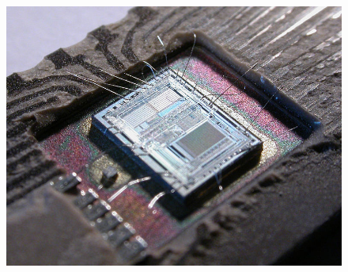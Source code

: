 \begin{frame}
\begin{minipage}{0.5\textwidth}
\vspace{0.5cm}
\begin{center}
\begin{figure}
        \includegraphics[width=\textwidth,height=.6\textheight,keepaspectratio]{e13/IC2.jpg}
      \end{figure}
\end{center}
\end{minipage}
\end{frame}

